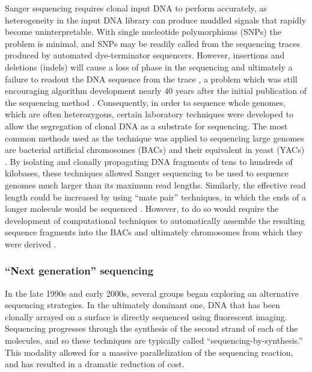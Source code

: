 Sanger sequencing requires clonal input DNA to perform accurately, as heterogeneity in the input DNA library can produce muddled signals that rapidly become uninterpretable.
With single nucleotide polymorphisms (SNPs) the problem is minimal, and SNPs may be readily called from the sequencing traces produced by automated dye-terminator sequencers.
However, insertions and deletions (indels) will cause a loss of phase in the sequencing and ultimately a failure to readout the DNA sequence from the trace \cite{tenney2007tale}, a problem which was still encouraging algorithm development nearly 40 years after the initial publication of the sequencing method \cite{hill2014poly}.
Consequently, in order to sequence whole genomes, which are often heterozygous, certain laboratory techniques were developed to allow the segregation of clonal DNA as a substrate for sequencing.
The most common methods used as the technique was applied to sequencing large genomes are bacterial artificial chromosomes (BACs) and their equivalent in yeast (YACs) \cite{monaco1994yacs}.
By isolating and clonally propagating DNA fragments of tens to hundreds of kilobases, these techniques allowed Sanger sequencing to be used to sequence genomes much larger than its maximum read lengths.
Similarly, the effective read length could be increased by using ``mate pair'' techniques, in which the ends of a longer molecule would be sequenced \cite{schmitt1996framework}.
However, to do so would require the development of computational techniques to automatically assemble the resulting sequence fragments into the BACs and ultimately chromosomes from which they were derived \cite{myers2000whole}.

\subsubsection{``Next generation'' sequencing}

In the late 1990s and early 2000s, several groups began exploring an alternative sequencing strategies.
In the ultimately dominant one, DNA that has been clonally arrayed on a surface is directly sequenced using fluorescent imaging.
Sequencing progresses through the synthesis of the second strand of each of the molecules, and so these techniques are typically called ``sequencing-by-synthesis.''
This modality allowed for a massive parallelization of the sequencing reaction, and has resulted in a dramatic reduction of cost.

